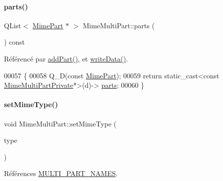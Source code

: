 \paragraph{\texorpdfstring{parts()}{parts()}}
{\footnotesize\ttfamily Q\+List$<$ \hyperlink{class_simple_mail_1_1_mime_part}{Mime\+Part} $\ast$ $>$ Mime\+Multi\+Part\+::parts (\begin{DoxyParamCaption}{ }\end{DoxyParamCaption}) const}



Référencé par \hyperlink{class_simple_mail_1_1_mime_multi_part_a11b7d5bc0ac8610d113f781fb6f8b52b}{add\+Part()}, et \hyperlink{class_simple_mail_1_1_mime_multi_part_acbd14f495f45d946eaf779d680bd7ce1}{write\+Data()}.


\begin{DoxyCode}
00057 \{
00058     Q\_D(\textcolor{keyword}{const} \hyperlink{class_simple_mail_1_1_mime_part}{MimePart});
00059     \textcolor{keywordflow}{return} \textcolor{keyword}{static\_cast<}\textcolor{keyword}{const }\hyperlink{class_simple_mail_1_1_mime_multi_part_private}{MimeMultiPartPrivate}*\textcolor{keyword}{>}(d)->
      \hyperlink{class_simple_mail_1_1_mime_multi_part_afdfbaaa95c2cd5aa38c0078f1e6e6a38}{parts};
00060 \}
\end{DoxyCode}
\mbox{\label{class_simple_mail_1_1_mime_multi_part_a4828f209e87597da86778a98f4466744}} 
\paragraph{\texorpdfstring{set\+Mime\+Type()}{setMimeType()}}
{\footnotesize\ttfamily void Mime\+Multi\+Part\+::set\+Mime\+Type (\begin{DoxyParamCaption}\item[{const \hyperlink{class_simple_mail_1_1_mime_multi_part_a6bef6836f893f87c64c4ff0cb9a93e53}{Multi\+Part\+Type}}]{type }\end{DoxyParamCaption})}



Références \hyperlink{mimemultipart_8cpp_aa142910ed0cce7101d8d240227ae592d}{M\+U\+L\+T\+I\+\_\+\+P\+A\+R\+T\+\_\+\+N\+A\+M\+ES}.


